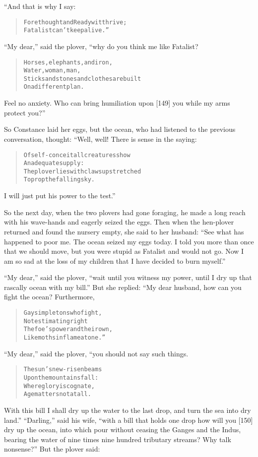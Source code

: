 \documentclass[article, twoside, 14pt]{memoir}
\renewenvironment{verbatim}{%
\begin{quote}%
\vskip -10pt%
\begin{alltt}\normalfont\large}{\end{alltt}%
\end{quote}%
\vskip -10pt
} %
\begin{document}
“And that is why I say:

\begin{verbatim}
Forethought and Readywit thrive;
Fatalist can't keep alive.”
\end{verbatim}
``My dear,'' said the plover, “why do you think me like Fatalist?

\begin{verbatim}
Horses, elephants, and iron,
Water, woman, man,
Sticks and stones and clothes are built
On a different plan.
\end{verbatim}
Feel no anxiety. Who can bring humiliation upon [149] you while my
arms protect you?”

So Constance laid her eggs, but the ocean, who had listened to the
previous conversation, thought: “Well, well! There is sense in the
saying:

\begin{verbatim}
Of self-conceit all creatures show
    An adequate supply:
The plover lies with claws upstretched
    To prop the falling sky.
\end{verbatim}
I will just put his power to the test.”

So the next day, when the two plovers had gone foraging, he made a
long reach with his wave-hands and eagerly seized the eggs. Then
when the hen-plover returned and found the nursery empty, she said
to her husband:
``See what has happened to poor me. The ocean seized my eggs today. I told you more than once that we should move, but you were stupid as Fatalist and would not go. Now I am so sad at the loss of my children that I have decided to burn myself.''

``My dear,'' said the plover,
``wait until you witness my power, until I dry up that rascally ocean with my bill.''
But she replied: “My dear husband, how can you fight the ocean?
Furthermore,

\begin{verbatim}
Gay simpletons who fight,
Not estimating right
The foe's power and their own,
Like moths in flame atone.”
\end{verbatim}
``My dear,'' said the plover, “you should not say such things.

\begin{verbatim}
The sun's new-risen beams
Upon the mountains fall:
Where glory is cognate,
Age matters not at all.
\end{verbatim}
With this bill I shall dry up the water to the last drop, and turn
the sea into dry land.” ``Darling,'' said his wife,
``with a bill that holds one drop how will you [150] dry up the ocean, into which pour without ceasing the Ganges and the Indus, bearing the water of nine times nine hundred tributary streams? Why talk nonsense?''
But the plover said:
\end{document}
